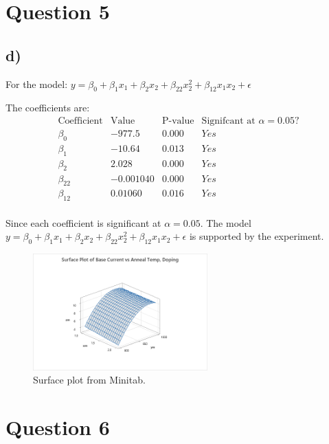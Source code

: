 \documentclass{article}
\begin{document}
\section*{Question 5}
\subsection*{d)}
For the model: $y = \beta_0 + \beta_1 x_1 + \beta_2 x_2 + \beta_{22} x^{2}_2 + \beta_{12} x_1 x_2 + \epsilon$

The coefficients are:
\begin{equation*}
    \begin{array}{c|c|c|c}
        \text{Coefficient} &\text{Value} &\text{P-value} &\text{Signifcant at } \alpha = 0.05\text{?}\\
        \hline
        \beta_0  & -977.5     & 0.000 & Yes\\
        \beta_1  & -10.64     & 0.013 & Yes\\
        \beta_2  & 2.028      & 0.000 & Yes\\
        \beta_22 & -0.001040  & 0.000 & Yes\\
        \beta_12 & 0.01060    & 0.016 & Yes
    
    \end{array}
    \end{equation*}\\

Since each coefficient is significant at $\alpha = 0.05$.
The model $y = \beta_0 + \beta_1 x_1 + \beta_2 x_2 + \beta_{22} x^{2}_2 + \beta_{12} x_1 x_2 + \epsilon$ is supported by the experiment.

\begin{figure}[h]
    \centering
    \includegraphics[width=0.6\textwidth]{./images/5_d.png}
    \caption{Surface plot from Minitab.}
    \label{fig:3_b_2}
\end{figure}

\section*{Question 6}
\end{document}

